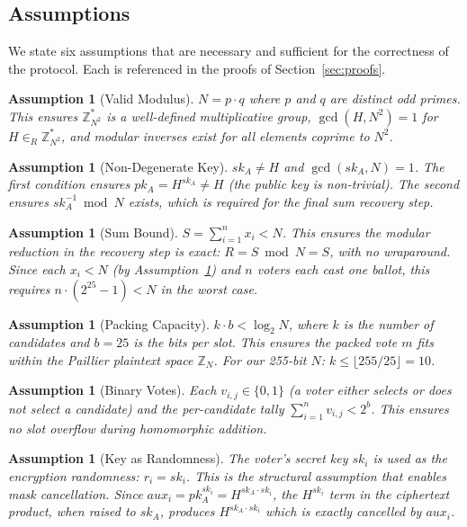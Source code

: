 \documentclass[11pt, a4paper]{article}
\newtheorem{assumption}[theorem]{Assumption}
\begin{document}
\subsection{Assumptions}

We state six assumptions that are necessary and sufficient for the correctness of the protocol. Each is referenced in the proofs of Section~\ref{sec:proofs}.

\begin{assumption}[Valid Modulus]\label{ass:modulus}
$N = p \cdot q$ where $p$ and $q$ are distinct odd primes. This ensures $\mathbb{Z}_{N^2}^*$ is a well-defined multiplicative group, $\gcd(H, N^2) = 1$ for $H \in_R \mathbb{Z}_{N^2}^*$, and modular inverses exist for all elements coprime to $N^2$.
\end{assumption}

\begin{assumption}[Non-Degenerate Key]\label{ass:key}
$sk_A \neq H$ and $\gcd(sk_A, N) = 1$. The first condition ensures $pk_A = H^{sk_A} \neq H$ (the public key is non-trivial). The second ensures $sk_A^{-1} \bmod N$ exists, which is required for the final sum recovery step.
\end{assumption}

\begin{assumption}[Sum Bound]\label{ass:sum}
$S = \sum_{i=1}^{n} x_i < N$. This ensures the modular reduction in the recovery step is exact: $R = S \bmod N = S$, with no wraparound. Since each $x_i < N$ (by Assumption~\ref{ass:packing}) and $n$ voters each cast one ballot, this requires $n \cdot (2^{25} - 1) < N$ in the worst case.
\end{assumption}

\begin{assumption}[Packing Capacity]\label{ass:packing}
$k \cdot b < \log_2 N$, where $k$ is the number of candidates and $b = 25$ is the bits per slot. This ensures the packed vote $m$ fits within the Paillier plaintext space $\mathbb{Z}_N$. For our 255-bit $N$: $k \leq \lfloor 255/25 \rfloor = 10$.
\end{assumption}

\begin{assumption}[Binary Votes]\label{ass:binary}
Each $v_{i,j} \in \{0, 1\}$ (a voter either selects or does not select a candidate) and the per-candidate tally $\sum_{i=1}^n v_{i,j} < 2^b$. This ensures no slot overflow during homomorphic addition.
\end{assumption}

\begin{assumption}[Key as Randomness]\label{ass:keyrand}
The voter's secret key $sk_i$ is used as the encryption randomness: $r_i = sk_i$. This is the structural assumption that enables mask cancellation. Since $aux_i = pk_A^{sk_i} = H^{sk_A \cdot sk_i}$, the $H^{sk_i}$ term in the ciphertext product, when raised to $sk_A$, produces $H^{sk_A \cdot sk_i}$ which is exactly cancelled by $aux_i$.
\end{assumption}
\end{document}
